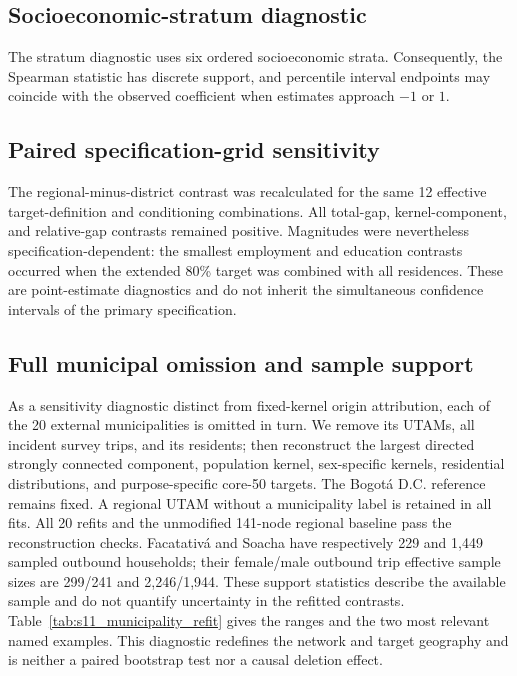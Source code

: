 \documentclass[11pt]{article}
\begin{document}
\subsection{Socioeconomic-stratum diagnostic}
The stratum diagnostic uses six ordered socioeconomic strata. Consequently, the
Spearman statistic has discrete support, and percentile interval endpoints may coincide
with the observed coefficient when estimates approach $-1$ or $1$.



\subsection{Paired specification-grid sensitivity}
The regional-minus-district contrast was recalculated for the same 12 effective
target-definition and conditioning combinations. All total-gap, kernel-component, and
relative-gap contrasts remained positive. Magnitudes were nevertheless
specification-dependent: the smallest employment and education contrasts occurred when
the extended 80\% target was combined with all residences. These are point-estimate
diagnostics and do not inherit the simultaneous confidence intervals of the primary
specification.



\subsection{Full municipal omission and sample support}
As a sensitivity diagnostic distinct from fixed-kernel origin attribution, each of the
20 external municipalities is omitted in turn. We remove its UTAMs, all incident
survey trips, and its residents; then reconstruct the largest directed strongly
connected component, population kernel, sex-specific kernels, residential
distributions, and purpose-specific core-50 targets. The Bogotá D.C. reference
remains fixed. A regional UTAM without a municipality label is retained in
all fits. All 20 refits and the unmodified 141-node regional baseline pass the
reconstruction checks. Facatativá and Soacha have respectively 229 and 1,449
sampled outbound households; their female/male outbound trip effective sample
sizes are 299/241 and 2,246/1,944. These support statistics describe the
available sample and do not quantify uncertainty in the refitted contrasts.
Table~\ref{tab:s11_municipality_refit} gives the ranges and the two most
relevant named examples. This diagnostic redefines the network and target
geography and is neither a paired bootstrap test nor a causal deletion effect.
\end{document}
